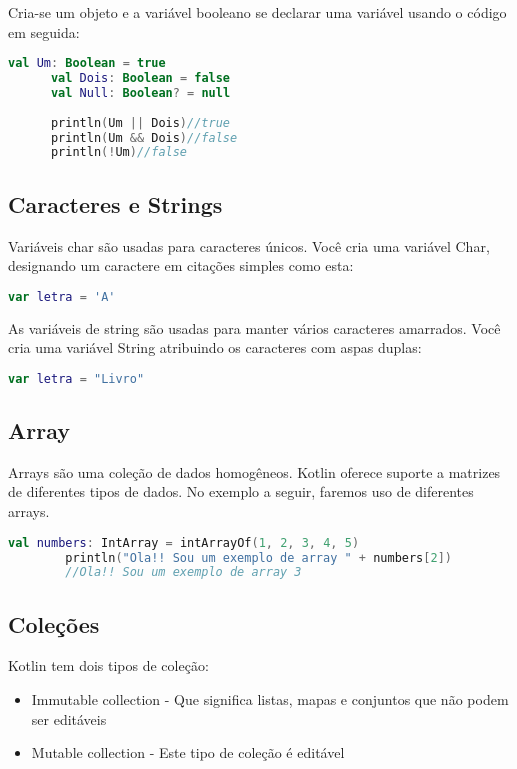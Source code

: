       Cria-se um objeto e a 
      variável booleano se declarar uma variável usando o 
      código em seguida:
      \begin{lstlisting}[label={lst:example1}, language=Kotlin]
      val Um: Boolean = true
      val Dois: Boolean = false
      val Null: Boolean? = null
      
      println(Um || Dois)//true
      println(Um && Dois)//false
      println(!Um)//false
      \end{lstlisting}

      \subsection{Caracteres e Strings}
      Variáveis char são usadas para caracteres únicos. 
      Você cria uma variável Char, designando um caractere 
      em citações simples como esta:
      \begin{lstlisting}[label={lst:example1}, language=Kotlin]
        var letra = 'A'
      \end{lstlisting}
      As variáveis de string são usadas para manter
      vários caracteres amarrados. Você cria uma 
      variável String atribuindo os caracteres 
      com aspas duplas:
      \begin{lstlisting}[label={lst:example1}, language=Kotlin]
        var letra = "Livro"
      \end{lstlisting}

      \subsection{Array}
      Arrays são uma coleção de dados homogêneos. 
      Kotlin oferece suporte a matrizes de diferentes tipos 
      de dados. No exemplo a seguir, faremos uso de 
      diferentes arrays.
      \begin{lstlisting}[label={lst:example1}, language=Kotlin]
        val numbers: IntArray = intArrayOf(1, 2, 3, 4, 5)
        println("Ola!! Sou um exemplo de array " + numbers[2])
        //Ola!! Sou um exemplo de array 3
      \end{lstlisting}
      
      \subsection{Coleções}
      Kotlin tem dois tipos de coleção:
      
      \begin{itemize}
        \item Immutable collection -
        Que significa listas, mapas e conjuntos 
      que não podem ser editáveis
        \item Mutable collection -
        Este tipo de coleção é editável
      \end{itemize}
      
